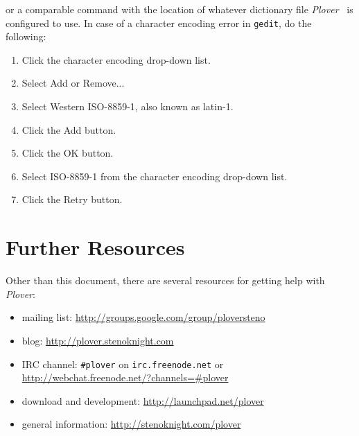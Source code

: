 \documentclass[11pt]{article}
\newcommand{\plover}{\emph{Plover}}
\newcommand{\code}[1]{\texttt{#1}}
\begin{document}
or a comparable command with the location of whatever dictionary file
\plover~ is configured to use. In case of a character encoding error
in \code{gedit}, do the following:
\begin{enumerate}
\item Click the character encoding drop-down list.
\item Select Add or Remove...
\item Select Western ISO-8859-1, also known as latin-1.
\item Click the Add button.
\item Click the OK button.
\item Select ISO-8859-1 from the character encoding drop-down list.
\item Click the Retry button.
\end{enumerate}

\section{Further Resources}
Other than this document, there are several resources for getting help
with \plover:

\begin{itemize}
\item mailing list: \url{http://groups.google.com/group/ploversteno}
\item blog: \url{http://plover.stenoknight.com}
\item IRC channel: \code{\#plover} on \code{irc.freenode.net} or \\
  \url{http://webchat.freenode.net/?channels=#plover}
\item download and development: \url{http://launchpad.net/plover}
\item general information: \url{http://stenoknight.com/plover}
\end{itemize}
\end{document}
